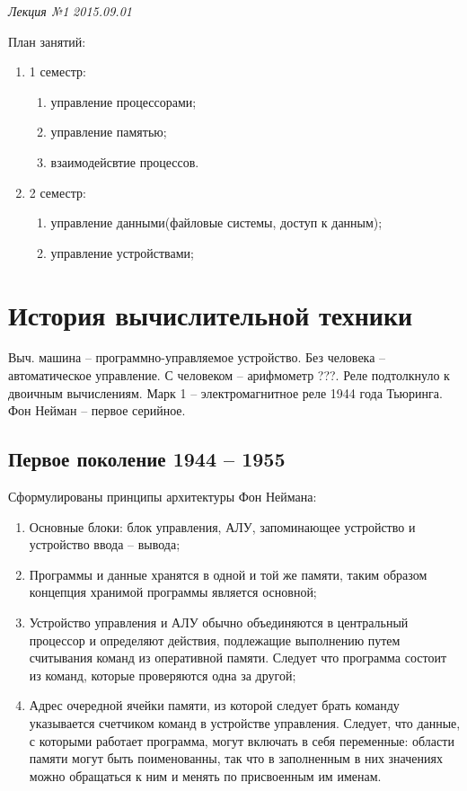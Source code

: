 \clearpage
\begin{flushright}
	\textit{Лекция №1}
	\textit{2015.09.01}
\end{flushright}

План занятий:
\begin{enumerate}
    \item 1 семестр:
    \begin{enumerate}
        \item управление процессорами;
        \item управление памятью;
        \item взаимодейсвтие процессов.
    \end{enumerate}
    \item 2 семестр:
    \begin{enumerate}
        \item управление данными(файловые системы, доступ к данным);
        \item управление устройствами;
    \end{enumerate}
\end{enumerate}

\chapter{История вычислительной техники}

Выч. машина – программно-управляемое устройство. 
Без человека – автоматическое управление. С человеком – арифмометр ???.
Реле подтолкнуло к двоичным вычислениям.
Марк 1 – электромагнитное реле 1944 года Тьюринга. Фон Нейман – первое серийное.

\section{Первое поколение 1944 – 1955} 

Сформулированы принципы архитектуры Фон Неймана:
\begin{enumerate}
    \item Основные блоки: блок управления, АЛУ, запоминающее устройство и устройство ввода – вывода;
    \item Программы и данные хранятся в одной и той же памяти, таким образом концепция хранимой программы является основной;
    \item Устройство управления и АЛУ обычно объединяются в центральный процессор и определяют действия, подлежащие выполнению путем считывания команд из оперативной памяти. Следует что программа состоит из команд, которые проверяются одна за другой;
    \item Адрес очередной ячейки памяти, из которой следует брать команду указывается счетчиком команд в устройстве управления. Следует, что данные, с которыми работает программа, могут включать в себя переменные: области памяти могут быть поименованны, так что в заполненным в них значениях можно обращаться к ним и менять по присвоенным им именам.
\end{enumerate}

